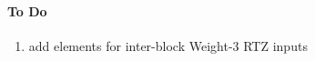 \documentclass[11pt, oneside, dvipdfmx]{book}
\begin{document}
\paragraph{To Do}
\begin{enumerate}
\item add elements for inter-block Weight-3 RTZ inputs
\end{enumerate}
 
\end{document}
